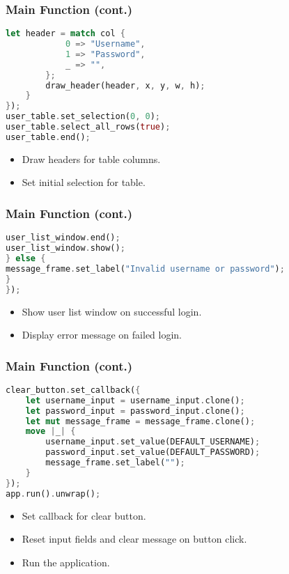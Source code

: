 \documentclass[aspectratio=169, table]{beamer}
\begin{document}
			
\begin{frame}[fragile]
	\frametitle{Main Function (cont.)}
	\begin{lstlisting}[language=Rust]
		let header = match col {
			0 => "Username",
			1 => "Password",
			_ => "",
		};
		draw_header(header, x, y, w, h);
	}
});
user_table.set_selection(0, 0);
user_table.select_all_rows(true);
user_table.end();
\end{lstlisting}
\begin{itemize}
\item Draw headers for table columns.
\item Set initial selection for table.
\end{itemize}
\end{frame}

\begin{frame}[fragile]
\frametitle{Main Function (cont.)}
\begin{lstlisting}[language=Rust]
user_list_window.end();
user_list_window.show();
} else {
message_frame.set_label("Invalid username or password");
}
});
\end{lstlisting}
\begin{itemize}
\item Show user list window on successful login.
\item Display error message on failed login.
\end{itemize}
\end{frame}

\begin{frame}[fragile]
\frametitle{Main Function (cont.)}
\vspace{15pt}
\begin{lstlisting}[language=Rust]
clear_button.set_callback({
	let username_input = username_input.clone();
	let password_input = password_input.clone();
	let mut message_frame = message_frame.clone();
	move |_| {
		username_input.set_value(DEFAULT_USERNAME);
		password_input.set_value(DEFAULT_PASSWORD);
		message_frame.set_label("");
	}
});
app.run().unwrap();
\end{lstlisting}
\begin{itemize}
\item Set callback for clear button.
\item Reset input fields and clear message on button click.
\item Run the application.
\end{itemize}
\end{frame}
\end{document}
